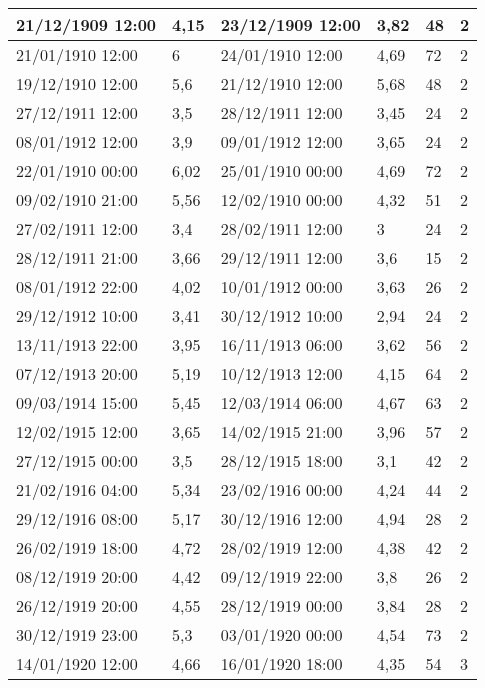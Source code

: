\documentclass[11pt]{article}
\begin{document}
\begin{longtable}{|l|p{2.3cm}|l|p{2.3cm}|l|l|}
        21/12/1909 12:00 & 4,15 & 23/12/1909 12:00 & 3,82 & 48 & 2 \\ \hline
        21/01/1910 12:00 & 6 & 24/01/1910 12:00 & 4,69 & 72 & 2 \\ \hline
        19/12/1910 12:00 & 5,6 & 21/12/1910 12:00 & 5,68 & 48 & 2 \\ \hline
        27/12/1911 12:00 & 3,5 & 28/12/1911 12:00 & 3,45 & 24 & 2 \\ \hline
        08/01/1912 12:00 & 3,9 & 09/01/1912 12:00 & 3,65 & 24 & 2 \\ \hline
        22/01/1910 00:00 & 6,02 & 25/01/1910 00:00 & 4,69 & 72 & 2 \\ \hline
        09/02/1910 21:00 & 5,56 & 12/02/1910 00:00 & 4,32 & 51 & 2 \\ \hline
        27/02/1911 12:00 & 3,4 & 28/02/1911 12:00 & 3 & 24 & 2 \\ \hline
        28/12/1911 21:00 & 3,66 & 29/12/1911 12:00 & 3,6 & 15 & 2 \\ \hline
        08/01/1912 22:00 & 4,02 & 10/01/1912 00:00 & 3,63 & 26 & 2 \\ \hline
        29/12/1912 10:00 & 3,41 & 30/12/1912 10:00 & 2,94 & 24 & 2 \\ \hline
        13/11/1913 22:00 & 3,95 & 16/11/1913 06:00 & 3,62 & 56 & 2 \\ \hline
        07/12/1913 20:00 & 5,19 & 10/12/1913 12:00 & 4,15 & 64 & 2 \\ \hline
        09/03/1914 15:00 & 5,45 & 12/03/1914 06:00 & 4,67 & 63 & 2 \\ \hline
        12/02/1915 12:00 & 3,65 & 14/02/1915 21:00 & 3,96 & 57 & 2 \\ \hline
        27/12/1915 00:00 & 3,5 & 28/12/1915 18:00 & 3,1 & 42 & 2 \\ \hline
        21/02/1916 04:00 & 5,34 & 23/02/1916 00:00 & 4,24 & 44 & 2 \\ \hline
        29/12/1916 08:00 & 5,17 & 30/12/1916 12:00 & 4,94 & 28 & 2 \\ \hline
        26/02/1919 18:00 & 4,72 & 28/02/1919 12:00 & 4,38 & 42 & 2 \\ \hline
        08/12/1919 20:00 & 4,42 & 09/12/1919 22:00 & 3,8 & 26 & 2 \\ \hline
        26/12/1919 20:00 & 4,55 & 28/12/1919 00:00 & 3,84 & 28 & 2 \\ \hline
        30/12/1919 23:00 & 5,3 & 03/01/1920 00:00 & 4,54 & 73 & 2 \\ \hline
        14/01/1920 12:00 & 4,66 & 16/01/1920 18:00 & 4,35 & 54 & 3 \\ \hline

\end{longtable}
\end{document}
